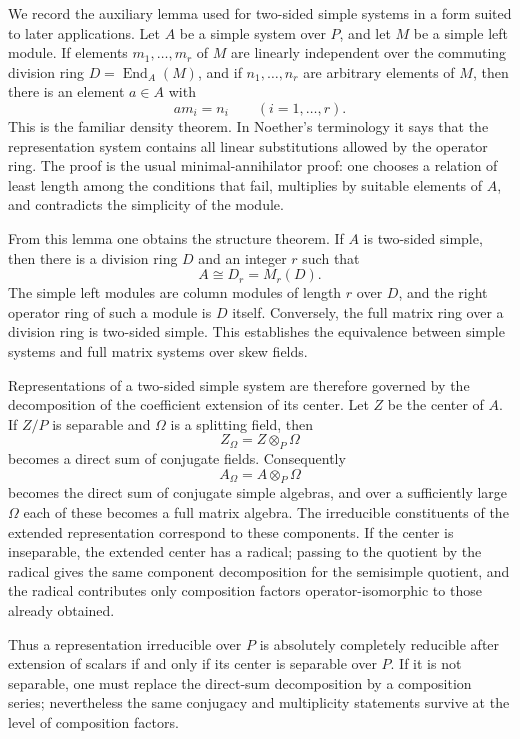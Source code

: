 \documentclass[11pt]{article}
\begin{document}
We record the auxiliary lemma used for two-sided simple systems in a form suited to later applications. Let \(A\) be a simple system over \(P\), and let \(M\) be a simple left module. If elements \(m_1,
\ldots,m_r\) of \(M\) are linearly independent over the commuting division ring \(D=\operatorname{End}_A(M)\), and if \(n_1,
\ldots,n_r\) are arbitrary elements of \(M\), then there is an element \(a\in A\) with
\[
  a m_i=n_i\qquad(i=1,
\ldots,r).
\]
This is the familiar density theorem. In Noether's terminology it says that the representation system contains all linear substitutions allowed by the operator ring. The proof is the usual minimal-annihilator proof: one chooses a relation of least length among the conditions that fail, multiplies by suitable elements of \(A\), and contradicts the simplicity of the module.

From this lemma one obtains the structure theorem. If \(A\) is two-sided simple, then there is a division ring \(D\) and an integer \(r\) such that
\[
  A\cong D_{r}=M_r(D).
\]
The simple left modules are column modules of length \(r\) over \(D\), and the right operator ring of such a module is \(D\) itself. Conversely, the full matrix ring over a division ring is two-sided simple. This establishes the equivalence between simple systems and full matrix systems over skew fields.

Representations of a two-sided simple system are therefore governed by the decomposition of the coefficient extension of its center. Let \(Z\) be the center of \(A\). If \(Z/P\) is separable and \(\Omega\) is a splitting field, then
\[
  Z_\Omega=Z\otimes_P\Omega
\]
becomes a direct sum of conjugate fields. Consequently
\[
  A_\Omega=A\otimes_P\Omega
\]
becomes the direct sum of conjugate simple algebras, and over a sufficiently large \(\Omega\) each of these becomes a full matrix algebra. The irreducible constituents of the extended representation correspond to these components. If the center is inseparable, the extended center has a radical; passing to the quotient by the radical gives the same component decomposition for the semisimple quotient, and the radical contributes only composition factors operator-isomorphic to those already obtained.

Thus a representation irreducible over \(P\) is absolutely completely reducible after extension of scalars if and only if its center is separable over \(P\). If it is not separable, one must replace the direct-sum decomposition by a composition series; nevertheless the same conjugacy and multiplicity statements survive at the level of composition factors.
\end{document}
